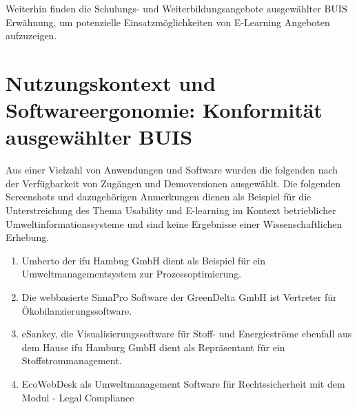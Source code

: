 \documentclass[a4paper, 12pt, twoside, BCOR=20mm, DIV=calc, abstracton, parskip=half*, toc=bibliography, toc=listof, headsepline, footsepline, headings=small, numbers=enddot]{scrreprt}
\begin{document}
	
	Weiterhin finden die Schulungs- und Weiterbildungsangebote ausgewählter \ac{BUIS} Erwähnung, um potenzielle Einsatzmöglichkeiten von E-Learning Angeboten aufzuzeigen.  
	
	\section{Nutzungskontext und Softwareergonomie: Konformität ausgewählter \ac{BUIS}}
	Aus einer Vielzahl von Anwendungen und Software wurden die folgenden nach der Verfügbarkeit von Zugängen und Demoversionen ausgewählt. Die folgenden Screenshots und dazugehörigen Anmerkungen dienen als Beispiel für die Unterstreichung des Thema Usability und E-learning im Kontext betrieblicher Umweltinformationssysteme und sind keine Ergebnisse einer Wissenschaftlichen Erhebung. 
	\begin{enumerate}
	\item Umberto der ifu Hambug GmbH dient als Beispiel für ein Umweltmanagementsystem zur Prozessoptimierung.\\
	\item Die webbasierte SimaPro Software der GreenDelta GmbH ist Vertreter für Ökobilanzierungssoftware. \\
	\item eSankey, die Visualisierungssoftware für Stoff- und Energieströme ebenfall aus dem Hause ifu Hamburg GmbH dient als Repräsentant für ein Stoffstrommanagement. 
	\item EcoWebDesk als Umweltmanagement Software für Rechtssicherheit mit dem Modul - Legal Compliance
	\end{enumerate}
\end{document}
